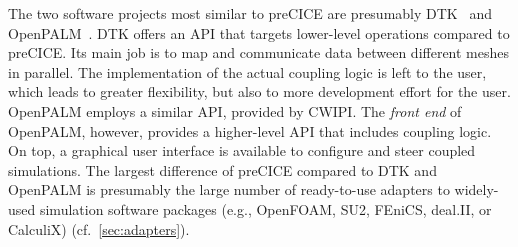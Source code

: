 The two software projects most similar to preCICE are presumably DTK~\cite{Slattery2013_DTK} and OpenPALM~\cite{Duchaine2015_OpenPALM}.
DTK offers an API that targets lower-level operations compared to preCICE. Its main job is to map and communicate data between different meshes in parallel. The implementation of the actual coupling logic is left to the user, which leads to greater flexibility, but also to more development effort for the user. OpenPALM employs a similar API, provided by CWIPI. The \textit{front end} of OpenPALM, however, provides a higher-level API that includes coupling logic. On top, a graphical user interface is available to configure and steer coupled simulations.
The largest difference of preCICE compared to DTK and OpenPALM is presumably the large number of ready-to-use adapters to widely-used simulation software packages (e.g., OpenFOAM, SU2, FEniCS, deal.II, or CalculiX) (cf.~\autoref{sec:adapters}).    




